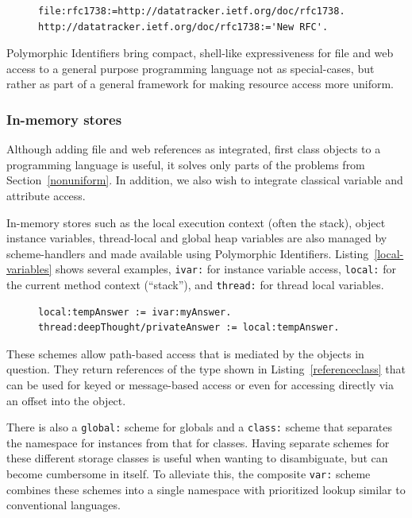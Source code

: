 \documentclass[preprint]{sigplanconf}
\begin{document}
\begin{figure}[htbp]
\begin{lstlisting}[style=numbers,label=download-to-file,caption=Downloading an RFC to a file.]
file:rfc1738:=http://datatracker.ietf.org/doc/rfc1738.
http://datatracker.ietf.org/doc/rfc1738:='New RFC'.
\end{lstlisting}
\end{figure}


Polymorphic Identifiers bring compact, shell-like expressiveness for file and web access
to a general purpose programming language not as special-cases, but rather as part of 
a general framework for making resource access more uniform.


\subsubsection{In-memory stores}

\label{inmemory}

Although adding file and web references as integrated, first class objects to a programming
language is useful, it solves only parts of the problems from Section~\ref{nonuniform}.
In addition, we also wish to integrate classical variable and attribute access.

In-memory stores such as the local execution context (often the stack), object instance
variables, thread-local and global heap variables are also managed by scheme-handlers
and made available using Polymorphic Identifiers.  Listing~\ref{local-variables} shows
several examples, {\tt ivar:} for instance variable access, {\tt local:} for the current
method context (``stack''), and {\tt thread:} for thread local variables.

\begin{figure}[htbp]
\begin{lstlisting}[style=numbers,label=local-variables,caption=Different memory variables.]
local:tempAnswer := ivar:myAnswer.
thread:deepThought/privateAnswer := local:tempAnswer.
\end{lstlisting}
\end{figure}

These schemes allow path-based access that is mediated by the objects in question. 
They return references of the type shown in Listing~\ref{referenceclass} that can
be used for keyed or message-based access or even for accessing directly
via an offset into the object.

There is also a {\tt global:} scheme for globals and a {\tt class:} scheme that separates
the namespace for instances from that for classes.  Having separate schemes for
these different storage classes is useful when wanting to disambiguate,
but can become cumbersome in itself.  To alleviate this, the composite
{\tt var:} scheme combines these schemes into a single namespace
with prioritized lookup similar to conventional languages.  
\end{document}
